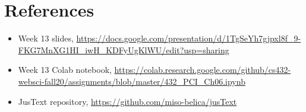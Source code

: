 \documentclass[12pt]{article}
\begin{document}
\section*{References}


\begin{itemize}
    \item {Week 13 slides, \url{https://docs.google.com/presentation/d/1TgSeYh7gjpxl8f_9-FKG7MnXG1HI_iwH_KDFyUgKlWU/edit?usp=sharing}}
    \item {Week 13 Colab notebook, \url{https://colab.research.google.com/github/cs432-websci-fall20/assignments/blob/master/432_PCI_Ch06.ipynb}}
    \item {JusText repository, \url{https://github.com/miso-belica/jusText}}
\end{itemize}
\end{document}
